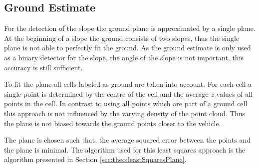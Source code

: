 \subsection{Ground Estimate}
For the detection of the slope the ground plane is approximated by a single plane. 
At the beginning of a slope the ground consists of two slopes, thus the single plane is not able to perfectly fit the ground. As the ground estimate is only used as a binary detector for the slope, the angle of the slope is not important, this accuracy is still sufficient.

To fit the plane all cells labeled as ground are taken into account. For each cell a single point is determined by the centre of the cell and the average $z$ values of all points in the cell. In contrast to using all points which are part of a ground cell this approach is not influenced by the varying density of the point cloud. Thus the plane is not biased towards the ground points closer to the vehicle.

The plane is chosen such that, the average squared error between the points and the plane is minimal. The algorithm used for this least squares approach is the algorithm presented in Section \ref{sec:theo:leastSquaresPlane}.
